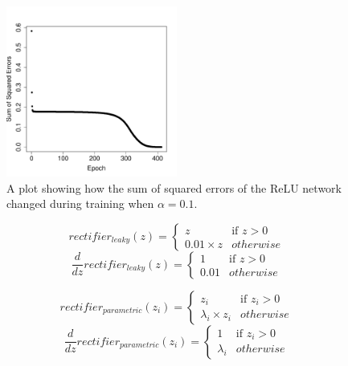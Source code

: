 \documentclass[xcolor={table}]{beamer}
\begin{document}
 \begin{frame} 
\begin{figure}[t]
\centerline{
\includegraphics[width=0.5\textwidth]{./images/fmlpda_8_21.pdf}
}
\caption[A plot showing how the sum of squared errors of the ReLU network changed during training when $\alpha=0.1$.]{A plot showing how the sum of squared errors of the ReLU network changed during training when $\alpha=0.1$.}
\label{fig:SSEperTrainingIterationNNReLUAlpha01}
\end{figure}
\end{frame} 



 \begin{frame} 
\begin{equation}
	rectifier_{leaky}(z)=\begin{cases}
		z & \text{if } z > 0\\
		0.01\times z & otherwise
		\end{cases}
	\label{eqn:lrectifier}
\end{equation}
\begin{equation}
\frac{d}{dz} rectifier_{leaky}(z) = 	\begin{cases}
		1 & \text{if } z > 0\\
		0.01 & otherwise
	\end{cases}
	\label{eqn:lrectifierderivatve}
\end{equation}
\end{frame} 



 \begin{frame} 
\begin{equation}
	rectifier_{parametric}(z_i)=\begin{cases}
		z_i & \text{if } z_i > 0\\
		\lambda_i \times z_i & otherwise
		\end{cases}
	\label{eqn:prectifier}
\end{equation}
\begin{equation}
\frac{d}{dz} rectifier_{parametric}(z_i) = 	\begin{cases}
		1 & \text{if } z_i > 0\\
		\lambda_i & otherwise
	\end{cases}
	\label{eqn:prectifierderivatve}
\end{equation}
\end{frame} 
\end{document}
